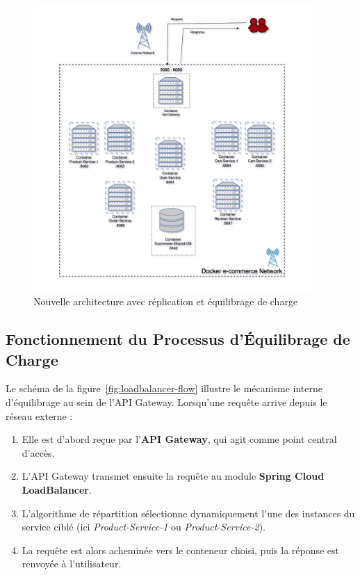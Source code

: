 \begin{figure}[H]
    \centering
    \includegraphics[width=0.95\textwidth]{images/arch-2.jpeg}
    \caption{Nouvelle architecture avec réplication et équilibrage de charge}
    \label{fig:replicated-architecture}
\end{figure}

\subsection{Fonctionnement du Processus d'Équilibrage de Charge}
Le schéma de la figure~\ref{fig:loadbalancer-flow} illustre le mécanisme interne d'équilibrage au sein de l'API Gateway.  
Lorsqu'une requête arrive depuis le réseau externe :
\begin{enumerate}
    \item Elle est d'abord reçue par l'\textbf{API Gateway}, qui agit comme point central d'accès.
    \item L'API Gateway transmet ensuite la requête au module \textbf{Spring Cloud LoadBalancer}.
    \item L'algorithme de répartition sélectionne dynamiquement l'une des instances du service ciblé (ici \textit{Product-Service-1} ou \textit{Product-Service-2}).
    \item La requête est alors acheminée vers le conteneur choisi, puis la réponse est renvoyée à l'utilisateur.
\end{enumerate}

